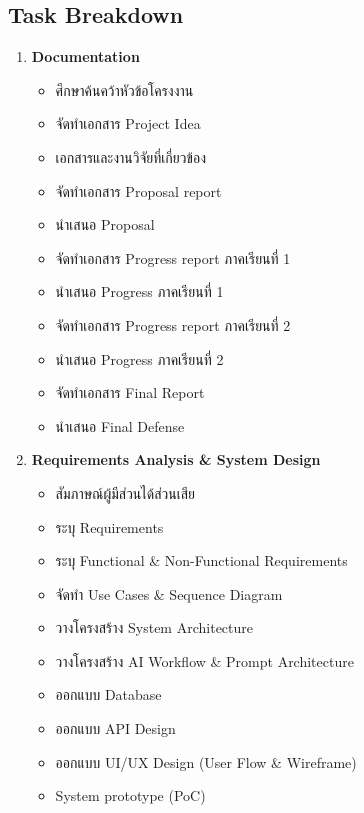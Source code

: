 \subsection{Task Breakdown}
\begin{enumerate}
  \item \textbf{Documentation}
    \begin{itemize}
      \item ศึกษาค้นคว้าหัวข้อโครงงาน
      \item จัดทำเอกสาร Project Idea
      \item เอกสารและงานวิจัยที่เกี่ยวข้อง
      \item จัดทำเอกสาร Proposal report
      \item นำเสนอ Proposal
      \item จัดทำเอกสาร Progress report ภาคเรียนที่ 1
      \item นำเสนอ Progress ภาคเรียนที่ 1
      \item จัดทำเอกสาร Progress report ภาคเรียนที่ 2
      \item นำเสนอ Progress ภาคเรียนที่ 2
      \item จัดทำเอกสาร Final Report
      \item นำเสนอ Final Defense
    \end{itemize}

  \item \textbf{Requirements Analysis \& System Design}
    \begin{itemize}
      \item สัมภาษณ์ผู้มีส่วนได้ส่วนเสีย
      \item ระบุ Requirements
      \item ระบุ Functional \& Non-Functional Requirements
      \item จัดทำ Use Cases \& Sequence Diagram
      \item วางโครงสร้าง System Architecture
      \item วางโครงสร้าง AI Workflow \& Prompt Architecture
      \item ออกแบบ Database
      \item ออกแบบ API Design
      \item ออกแบบ UI/UX Design (User Flow \& Wireframe)
      \item System prototype (PoC)
    \end{itemize}


\end{enumerate}
